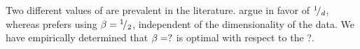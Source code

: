 Two different values of \varMBESensitivityParam are prevalent in the literature. \textcite{breiman1977variable} argue in favor of ${}^{1}\!/_{d}$, whereas \textcite{silverman1986density} prefers using $\beta = {}^{1}\!/_{2}$, independent of the dimensionality of the data. We have empirically determined that $\beta = ?$  is optimal with respect to the ?.

